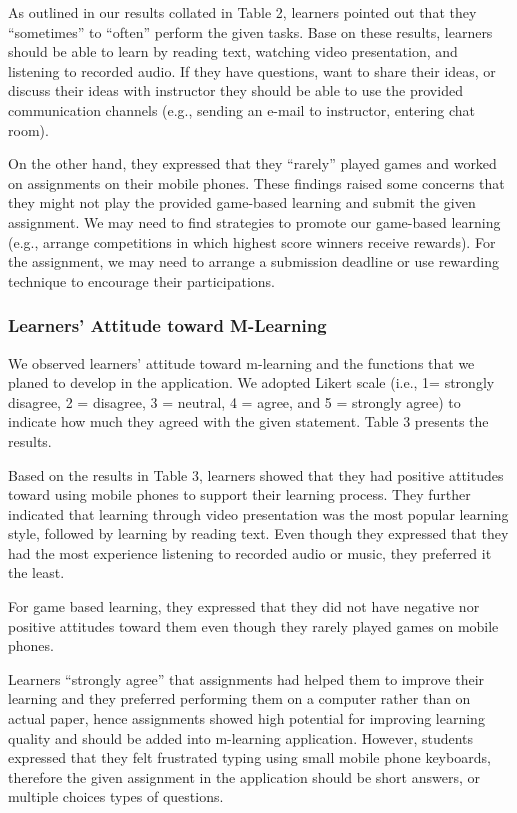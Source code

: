 \documentclass[a4paper,twoside]{article}
\begin{document}
As outlined in our results collated in Table 2, learners pointed out that they ``sometimes'' to ``often'' perform the given tasks. Base on these results, learners should be able to learn by reading text, watching video presentation, and listening to recorded audio. If they have questions, want to share their ideas, or discuss their ideas with instructor they should be able to use the provided communication channels (e.g., sending an e-mail to instructor, entering chat room).

On the other hand, they expressed that they ``rarely'' played games and worked on assignments on their mobile phones. These findings raised some concerns that they might not play the provided game-based learning and submit the given assignment. We may need to find strategies to promote our game-based learning (e.g., arrange competitions in which highest score winners receive rewards). For the assignment, we may need to arrange a submission deadline or use rewarding technique to encourage their participations. 

\subsubsection{Learners' Attitude toward M-Learning}
We observed learners' attitude toward m-learning and the functions that we planed to develop in the application. We adopted Likert scale (i.e., 1= strongly disagree, 2 = disagree, 3 = neutral, 4 = agree, and 5 = strongly agree) to indicate how much they agreed with the given statement. Table 3 presents the results. 

Based on the results in Table 3, learners showed that they had positive attitudes toward using mobile phones to support their learning process. They further indicated that learning through video presentation was the most popular learning style, followed by learning by reading text. Even though they expressed that they had the most experience listening to recorded audio or music, they preferred it the least. 

For game based learning, they expressed that they did not have negative nor positive attitudes toward them even though they rarely played games on mobile phones. 

Learners ``strongly agree'' that assignments had helped them to improve their learning and they preferred performing them on a computer rather than on actual paper, hence assignments showed high potential for improving learning quality and should be added into m-learning application. However, students expressed that they felt frustrated typing using small mobile phone keyboards, therefore the given assignment in the application should be short answers, or multiple choices types of questions. 
\end{document}
